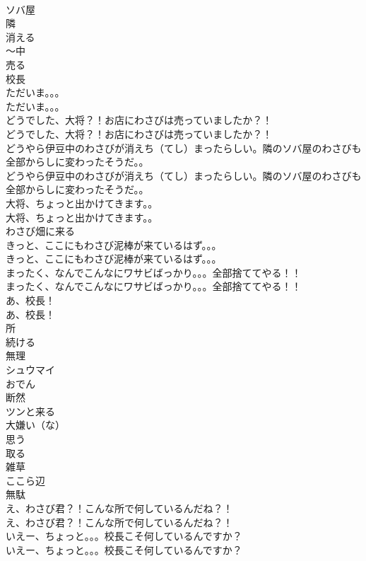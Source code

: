 \documentclass[8pt]{extreport}
\begin{document}
\begin{CJK}{UTF8}{min}
\\	ソバ屋
\\	隣
\\	消える
\\	～中
\\	売る
\\	校長
\\	ただいま。。。	
\\	ただいま。。。 
\\	どうでした、大将？！お店にわさびは売っていましたか？！	
\\	どうでした、大将？！お店にわさびは売っていましたか？！ 
\\	どうやら伊豆中のわさびが消えち（てし）まったらしい。隣のソバ屋のわさびも全部からしに変わったそうだ。。	
\\	どうやら伊豆中のわさびが消えち（てし）まったらしい。隣のソバ屋のわさびも全部からしに変わったそうだ。。 
\\	大将、ちょっと出かけてきます。。	
\\	大将、ちょっと出かけてきます。。 
\\	わさび畑に来る	
\\	きっと、ここにもわさび泥棒が来ているはず。。。	
\\	きっと、ここにもわさび泥棒が来ているはず。。。 
\\	まったく、なんでこんなにワサビばっかり。。。全部捨ててやる！！	
\\	まったく、なんでこんなにワサビばっかり。。。全部捨ててやる！！ 
\\	あ、校長！	
\\	あ、校長！ 
\\	所
\\	続ける
\\	無理
\\	シュウマイ
\\	おでん
\\	断然
\\	ツンと来る
\\	大嫌い（な）
\\	思う
\\	取る
\\	雑草
\\	ここら辺
\\	無駄
\\	え、わさび君？！こんな所で何しているんだね？！	
\\	え、わさび君？！こんな所で何しているんだね？！ 
\\	いえー、ちょっと。。。校長こそ何しているんですか？	
\\	いえー、ちょっと。。。校長こそ何しているんですか？ 

\end{CJK}
\end{document}
